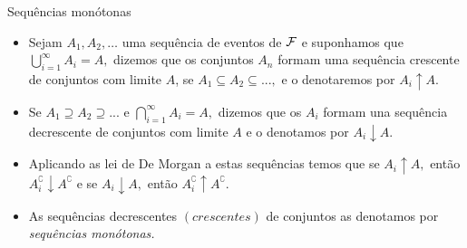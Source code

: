 \begin{frame}
\begin{block}{Sequências monótonas}
	\begin{itemize}
		\item Sejam  $A_1, A_2, \ldots$ uma sequência de eventos de
		${\cal F}$ e suponhamos que $\bigcup _{i=1}^{\infty }A_i=A,$ dizemos que os
		conjuntos $A_{n}$ formam uma sequência crescente de conjuntos com limite $A$, se
		$A_{1}\subseteq A_{2}\subseteq
		...,$  e  o denotaremos por $A_{i}\uparrow A.$ 
		
		\item Se $A_{1}\supseteq
		A_{2}\supseteq ...$ e $\bigcap _{i=1}^{\infty }A_{i}=A,$ dizemos que os $A_{i}$
		formam una sequência decrescente de conjuntos com limite $A$ e o
		denotamos por $A_{i}\downarrow A.$ 
		
		\item Aplicando as lei de De Morgan a estas
		sequências temos que se $A_{i}\uparrow A,$ então $A_{i}^\complement\downarrow
		A^\complement$ e se $A_{i}\downarrow A,$ então $A_{i}^\complement\uparrow A^\complement $. 
		
		\item As sequências
		decrescentes $\left( crescentes\right) $ de conjuntos as denotamos por
		{\it sequências monótonas.}
		
	\end{itemize}
\end{block}
\end{frame}

